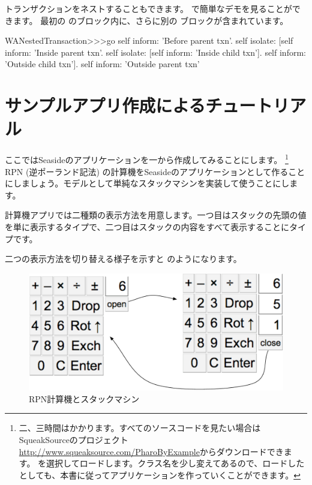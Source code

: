 \documentclass[a4paper,10pt,twoside]{book}
\begin{document}
トランザクションをネストすることもできます。 で簡単なデモを見ることができます。
最初の のブロック内に、さらに別の ブロックが含まれています。

\begin{code}{}
WANestedTransaction>>>go
	self inform: 'Before parent txn'.
	self isolate:
			[self inform: 'Inside parent txn'.
			self isolate: [self inform: 'Inside child txn'].
			self inform: 'Outside child txn'].
	self inform: 'Outside parent txn'
\end{code}


\section{サンプルアプリ作成によるチュートリアル}


ここではSeasideのアプリケーションを一から作成してみることにします。 \footnote{二、三時間はかかります。すべてのソースコードを見たい場合はSqueakSourceのプロジェクト \url{http://www.squeaksource.com/PharoByExample}からダウンロードできます。 を選択してロードします。クラス名を少し変えてあるので、ロードしたとしても、本書に従ってアプリケーションを作っていくことができます。}
RPN (逆ポーランド記法) の計算機をSeasideのアプリケーションとして作ることにしましょう。モデルとして単純なスタックマシンを実装して使うことにします。

計算機アプリでは二種類の表示方法を用意します。一つ目はスタックの先頭の値を単に表示するタイプで、二つ目はスタックの内容をすべて表示することにタイプです。

二つの表示方法を切り替える様子を示すと のようになります。

\begin{figure}[ht]
\begin{center}
\includegraphics[width=\textwidth]{stackMachine}
\caption{RPN計算機とスタックマシン}
\end{center}
\end{figure}
\end{document}

